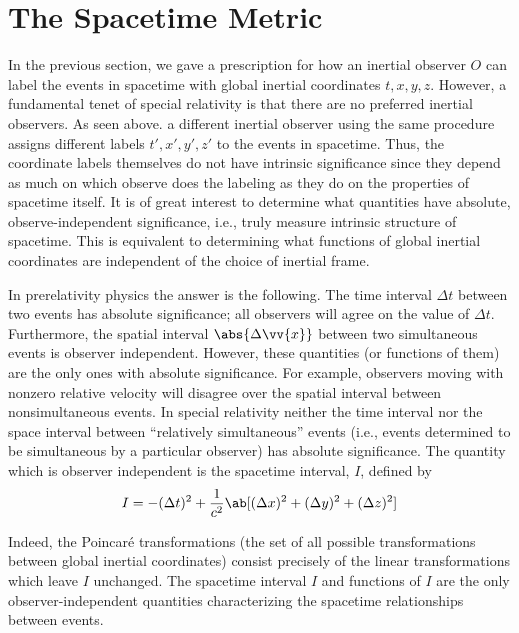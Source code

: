 \section{The Spacetime Metric}

In the previous section, we gave a prescription for how an inertial observer $O$ can label the events in spacetime with global inertial coordinates $t, x, y, z$. However, a fundamental tenet of special relativity is that there are no preferred inertial observers. As seen above. a different inertial observer using the same procedure assigns different labels $t',x',y',z'$ to the events in spacetime. Thus, the coordinate labels themselves do not have intrinsic significance since they depend as much on which observe does the labeling as they do on the properties of spacetime itself. It is of great interest to determine what quantities have absolute, observe-independent significance, i.e., truly measure intrinsic structure of spacetime. This is equivalent to determining what functions of global inertial coordinates are independent of the choice of inertial frame.

In prerelativity physics the answer is the following. The time interval $\Delta t$ between two events has absolute significance; all observers will agree on the value of $\Delta t$. Furthermore, the spatial interval $\abs{\Delta\vv{x}}$ between two simultaneous events is observer independent. However, these quantities (or functions of them) are the only ones with absolute significance. For example, observers moving with nonzero relative velocity will disagree over the spatial interval between nonsimultaneous events. In special relativity neither the time interval nor the space interval between ``relatively simultaneous'' events (i.e., events determined to be simultaneous by a particular observer) has absolute significance. The quantity which is observer independent is the spacetime interval, $I$, defined by
\begin{equation}
    I=-(\Delta t)^2+\frac{1}{c^2}\ab[(\Delta x)^2+(\Delta y)^2+(\Delta z)^2]
    \label{1.3.1}
\end{equation}

Indeed, the Poincaré transformations (the set of all possible transformations between global inertial coordinates) consist precisely of the linear transformations which leave $I$ unchanged. The spacetime interval $I$ and functions of $I$ are the only observer-independent quantities characterizing the spacetime relationships between events.

